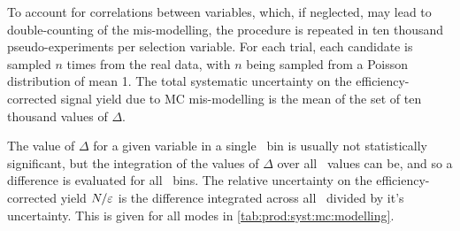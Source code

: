 To account for correlations between variables, which, if neglected, may lead to 
double-counting of the mis-modelling, the procedure is repeated in ten thousand 
pseudo-experiments per selection variable.
For each trial, each candidate is sampled $n$ times from the real data, with 
$n$ being sampled from a Poisson distribution of mean 1.
The total systematic uncertainty on the efficiency-corrected signal yield due 
to \ac{MC} mis-modelling is the mean of the set of ten thousand values of 
$\Delta$.

The value of $\Delta$ for a given variable in a single \pTy\ bin is usually not 
statistically significant, but the integration of the values of $\Delta$ over 
all \pTy\ values can be, and so a difference is evaluated for all \pTy\ bins.
The relative uncertainty on the efficiency-corrected yield $N/\varepsilon$ is the 
difference integrated across all \pTy\ divided by it's uncertainty.
This is given for all modes in \cref{tab:prod:syst:mc:modelling}.

